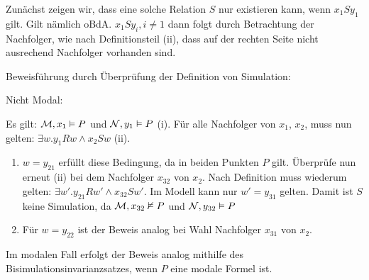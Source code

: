 Zunächst zeigen wir, dass eine solche Relation $S$ nur existieren kann, wenn
$x_1 S y_1$ gilt. Gilt nämlich oBdA. $x_1 S y_i, i \neq 1$ dann folgt durch
Betrachtung der Nachfolger, wie nach Definitionsteil (ii), dass auf der rechten
Seite nicht ausrechend Nachfolger vorhanden sind.

Beweisführung durch Überprüfung der Definition von Simulation:

Nicht Modal:

Es gilt: $\mathcal{M}, x_1 \vDash P$ und $\mathcal{N},y_1 \vDash P$ (i). Für alle
Nachfolger von $x_1$, $x_2$, muss nun gelten: $\exists w.y_1 R w \wedge x_2 S w$
(ii).
\begin{enumerate}
	\item $w = y_{21}$ erfüllt diese Bedingung, da in beiden Punkten $P$ gilt.
		Überprüfe nun erneut (ii) bei dem Nachfolger $x_{32}$ von $x_2$. Nach
		Definition muss wiederum gelten: $\exists w'.y_{21} R w' \wedge x_{32} S
		w'$. Im Modell  kann nur $w' = y_{31}$ gelten. Damit ist $S$
		keine Simulation, da $\mathcal{M}, x_{32} \nvDash P$ und $\mathcal{N},
		y_{32} \vDash P$
	\item Für $w = y_{22}$ ist der Beweis analog bei Wahl Nachfolger $x_{31}$
		von $x_2$.
\end{enumerate}

Im modalen Fall erfolgt der Beweis analog mithilfe des
Bisimulationsinvarianzsatzes, wenn $P$ eine modale Formel ist.

